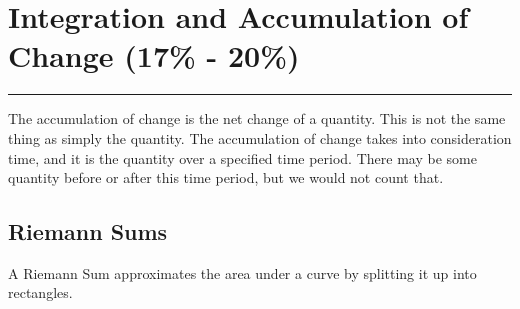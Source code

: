 \documentclass[12pt]{article}
\begin{document}
    \section{Integration and Accumulation of Change (17\% - 20\%)}
    \par\noindent\rule{\textwidth}{0.1pt}
        The accumulation of change is the net change of a quantity. This is not the same thing as simply the quantity. The accumulation of change takes into consideration time, and it is the quantity over a specified time period. There may be some quantity before or after this time period, but we would not count that.

        \subsection{Riemann Sums}
            A Riemann Sum approximates the area under a curve by splitting it up into rectangles.
\end{document}
